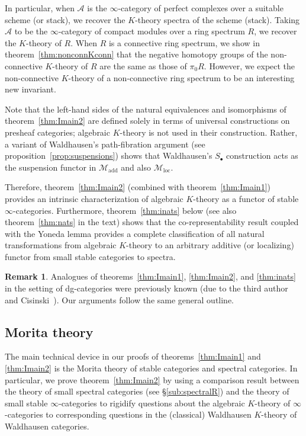 \documentclass{amsart}
\newcommand{\ssdot}{\bullet}%
\newcommand{\Sdot}[1][\ssdot]{S_{#1}}
\newcommand{\cA}{{\mathcal A}}
\newcommand{\cM}{{\mathcal M}}
\renewcommand{\i}{\infty}
\newcommand{\Motadd}{\cM_{\mathrm{add}}}
\newcommand{\Motloc}{\cM_\mathrm{loc}}
\numberwithin{equation}{section}
\theoremstyle{definition}
\newtheorem{remark}[equation]{Remark}
\begin{document}
In particular, when $\cA$ is the $\i$-category of perfect complexes
over a suitable scheme (or stack), we recover the $K$-theory spectra of the
scheme (stack).  Taking $\cA$ to be the $\i$-category of compact
modules over a ring spectrum $R$, we recover the $K$-theory of $R$.
When $R$ is a connective ring spectrum, we show in
theorem~\ref{thm:nonconnKconn} that the negative homotopy groups of the non-connective $K$-theory of $R$ are the same as those of $\pi_0R$.
However, we expect the non-connective $K$-theory of a non-connective
ring spectrum to be an interesting new invariant.

Note that the left-hand sides of the natural equivalences and
isomorphisms of theorem~\ref{thm:Imain2} are defined solely in terms
of universal constructions on presheaf categories; algebraic
$K$-theory is not used in their construction.  Rather, a variant of
Waldhausen's path-fibration argument (see
proposition~\ref{prop:suspensions}) shows that Waldhausen's $\Sdot$ construction acts as the suspension functor
in $\Motadd$ and also $\Motloc$.

Therefore, theorem~\ref{thm:Imain2} (combined with
theorem~\ref{thm:Imain1}) provides an intrinsic characterization of
algebraic $K$-theory as a functor of stable $\i$-categories.
Furthermore, theorem~\ref{thm:inats} below (see also
theorem~\ref{thm:nats} in the text) shows that the co-representability
result coupled with the Yoneda lemma provides a complete
classification of all natural transformations from
algebraic $K$-theory to an arbitrary additive (or localizing) functor
from small stable categories to spectra.

\begin{remark}
Analogues of theorems~\ref{thm:Imain1}, \ref{thm:Imain2},
and \ref{thm:inats} in the setting of dg-categories were previously
known (due to the third author and
Cisinski~\cite{CisTab0,CisTab,Duke}).  Our arguments follow the
same general outline.  
\end{remark}

\subsection{Morita theory}

The main technical device in our proofs of theorems~\ref{thm:Imain1}
and \ref{thm:Imain2} is the Morita theory of stable categories and
spectral categories.  In particular, we prove theorem~\ref{thm:Imain2}
by using a comparison result between the theory of small spectral
categories (see \S\ref{sub:spectralR}) and the theory of small stable
$\i$-categories to rigidify questions about the algebraic $K$-theory
of $\i$-categories to corresponding questions in the (classical)
Waldhausen $K$-theory of Waldhausen categories.
\end{document}
